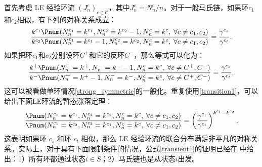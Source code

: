 首先考虑 LE 经验环流 $(J^c_n)_{c\in\mathcal{C}}$，其中$J_n^c=N_n^c/n$。对于一般马氏链，如果环$c_1$和$c_2$相似，有下列的对称关系成立：
\begin{equation}\label{transient1}
    \frac{k^{c_1} \Pnum(N^{c_1}_n=k^{c_1},N^{c_2}_n=k^{c_2}-1,N^{c}_n=k^{c},\;\forall c\neq c_1,c_2)}
    {k^{c_2} \Pnum(N^{c_1}_n=k^{c_1} -1,N^{c_2}_n=k^{c_2},N^{c}_n=k^{c},\;\forall c\neq c_1,c_2)}
    = \frac{\gamma^{c_s}}{\gamma^{c_t}}.
\end{equation}
如果把环$c_1$和$c_2$分别设环$C^+$和它的反环$C^-$，那么等式可以化为：
\begin{equation*}
    \frac{k^{+} \Pnum(N^{+}_n=k^{+},N^{-}_n=k^{-}-1,N^{c}_n=k^{c},\;\forall c\neq C^+,C^-)}
    {k^{-} \Pnum(N^{+}_n=k^{+} -1,N^{-}_n=k^{-},N^{c}_n=k^{c},\;\forall c\neq C^+,C^-)}
    = \frac{\gamma^{c_s}}{\gamma^{c_t}}.
\end{equation*}
这可以被看做单环情况\ref{strong_symmetric}的一般化。重复使用\ref{transition1}，可以给出下面LE环流的暂态涨落定理：
\begin{equation}\label{transient2}
    \frac{\Pnum(N^{c_1}_n=k^{c_1},N^{c_2}_n=k^{c_2},N^{c}_n=k^{c},\;\forall c\neq c_1,c_2)}
    {\Pnum(N^{c_1}_n=k^{c_2},N^{c_2}_n=k^{c_1},N^{c}_n=k^{c},\;\forall c\neq c_1,c_2)}
    = \left(\frac{\gamma^{c_1}}{\gamma^{c_t}}\right)^{k^{c_1}-k^{c_2}}.
\end{equation}
这表明如果环 $c_s$ 和环 $c_t$ 相似，那么 LE 经验环流的联合分布满足非平凡的对称关系。实际上，对于具有下面限制条件的情况，公式\ref{transient1}的证明已经在 \cite{jia2016cycle}中给出：1）所有环都通过状态$i\in S$；2）马氏链也是从状态$i$出发。



